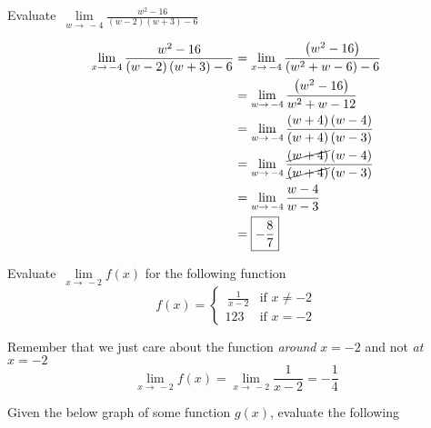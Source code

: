 \documentclass[addpoints]{exam}
\begin{document}
\begin{questions}
  \question Evaluate $\displaystyle\, \lim\limits_{w\to\,-4} \frac{w^2-16}{\left(w-2\right)\left(w+3\right)-6}$ 
  \begin{solution}[\stretch{1}]
    \begin{align*}
      \lim\limits_{x\to\,-4} \frac{w^2-16}{\left(w-2\right)\left(w+3\right)-6} &= \lim\limits_{x\to\,-4} \frac{\left(w^2-16\right)}{\left(w^2+w-6\right)-6} \\ 
      &= \lim\limits_{w\to\,-4} \frac{\left(w^2-16\right)}{w^2+w-12} \\ 
      &= \lim\limits_{w\to\,-4} \frac{\left(w+4\right)\left(w-4\right)}{\left(w+4\right)\left(w-3\right)} \\ 
      &= \lim\limits_{w\to\,-4} \frac{\cancel{\left(w+4\right)}\left(w-4\right)}{\cancel{\left(w+4\right)}\left(w-3\right)} \\ 
      &= \lim\limits_{w\to\,-4} \frac{w-4}{w-3} \\ 
      &= \boxed{-\frac{8}{7}}
    \end{align*}
  \end{solution}

  \newpage 

  \question Evaluate $\displaystyle\, \lim\limits_{x\to\,-2} f(x)$ for the following function 
  \[
    f(x) = \left\{ \begin{array}{ll} \displaystyle\,\frac{1}{x-2} & \mbox{if } x \ne -2 \\ 123 & \mbox{if } x = -2\end{array}\right.
  \]
  \begin{solution}[\stretch{1}]
    Remember that we just care about the function \textit{around} $x=-2$ and not \textit{at} $x=-2$
    \[\lim\limits_{x\to\,-2} f(x) = \lim\limits_{x\to\,-2} \frac{1}{x-2} = \boxed{-\frac{1}{4}}\] 
  \end{solution}

  \question Given the below graph of some function $g(x)$, evaluate the following
  \vspace{0.1in}
  \newline
  \begin{minipage}{0.45\linewidth}
\end{minipage}
\end{questions}
\end{document}
